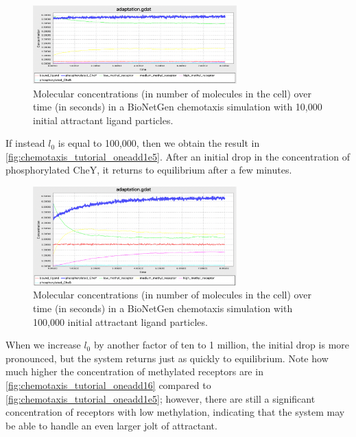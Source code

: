 \begin{figure}[h]
\centering
\mySfFamily
\includegraphics[width = 0.7\textwidth]{../images/chemotaxis_tutorial_oneadd1e4.png}
\caption{Molecular concentrations (in number of molecules in the cell) over time (in seconds) in a BioNetGen chemotaxis simulation with 10,000 initial attractant ligand particles.}
\label{fig:chemotaxis_tutorial_oneadd1e4}
\end{figure}


If instead $l_0$ is equal to 100,000, then we obtain the result in \autoref{fig:chemotaxis_tutorial_oneadd1e5}. After an initial drop in the concentration of phosphorylated CheY, it returns to equilibrium after a few minutes.

\begin{figure}[h]
\centering
\mySfFamily
\includegraphics[width = 0.7\textwidth]{../images/chemotaxis_tutorial_oneadd1e5.png}
\caption{Molecular concentrations (in number of molecules in the cell) over time (in seconds) in a BioNetGen chemotaxis simulation with 100,000 initial attractant ligand particles.}
\label{fig:chemotaxis_tutorial_oneadd1e5}
\end{figure}


When we increase $l_0$ by another factor of ten to 1 million, the initial drop is more pronounced, but the system returns just as quickly to equilibrium. Note how much higher the concentration of methylated receptors are in \autoref{fig:chemotaxis_tutorial_oneadd16} compared to \autoref{fig:chemotaxis_tutorial_oneadd1e5}; however, there are still a significant concentration of receptors with low methylation, indicating that the system may be able to handle an even larger jolt of attractant.

